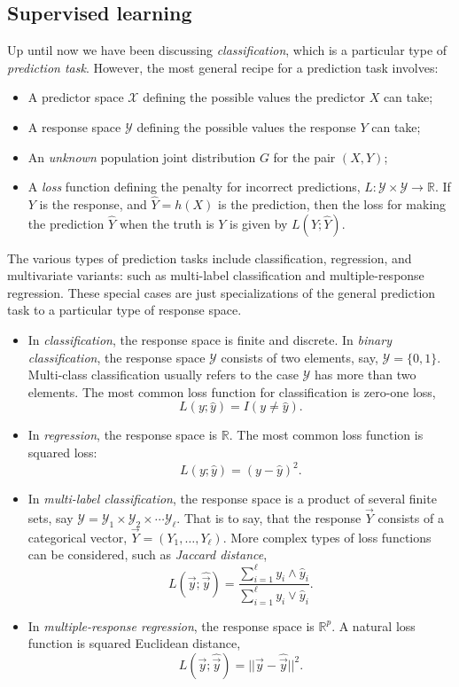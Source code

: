\subsection{Supervised learning}

Up until now we have been discussing \emph{classification}, which is a
particular type of \emph{prediction task}.  However, the most general
recipe for a prediction task involves:

\begin{itemize}
\item A predictor space $\mathcal{X}$ defining the possible values the predictor $X$ can take;
\item A response space $\mathcal{Y}$ defining the possible values the response $Y$ can take;
\item An \emph{unknown} population joint distribution $G$ for the pair $(X, Y)$;
\item A \emph{loss} function defining the penalty for incorrect
  predictions, $L: \mathcal{Y} \times \mathcal{Y} \to \mathbb{R}$.  If
  $Y$ is the response, and $\hat{Y} = h(X)$ is the prediction, then
  the loss for making the prediction $\hat{Y}$ when the truth is $Y$
  is given by $L(Y; \hat{Y})$.
\end{itemize}

The various types of prediction tasks include classification,
regression, and multivariate variants: such as multi-label
classification and multiple-response regression.  These special cases
are just specializations of the general prediction task to a
particular type of response space.

\begin{itemize}
\item In \emph{classification}, the response space is finite and
  discrete.  In \emph{binary classification}, the response space
  $\mathcal{Y}$ consists of two elements, say, $\mathcal{Y} = \{0,
  1\}$.  Multi-class classification usually refers to the case
  $\mathcal{Y}$ has more than two elements.  The most common loss
  function for classification is zero-one loss,
\[
L(y; \hat{y}) = I(y \neq \hat{y}).
\]
\item In \emph{regression}, the response space is $\mathbb{R}$.  The most common loss function is squared loss:
\[
L(y; \hat{y}) = (y - \hat{y})^2.
\]
\item In \emph{multi-label classification}, the response space is a
  product of several finite sets, say $\mathcal{Y} = \mathcal{Y}_1
  \times \mathcal{Y}_2 \times \cdots \mathcal{Y}_\ell$.  That is to
  say, that the response $\vec{Y}$ consists of a categorical vector,
  $\vec{Y} = (Y_1,\hdots, Y_\ell)$. More complex types of loss
  functions can be considered, such as \emph{Jaccard distance},
\[
L(\vec{y}; \hat{\vec{y}}) = \frac{\sum_{i=1}^\ell y_i \wedge \hat{y}_i}{\sum_{i=1}^\ell y_i \vee \hat{y}_i}.
\]
\item In \emph{multiple-response regression}, the response space is $\mathbb{R}^p$.  A natural loss function is squared Euclidean distance,
\[
L(\vec{y}; \hat{\vec{y}}) = ||\vec{y} - \hat{\vec{y}}||^2.
\]
\end{itemize}

